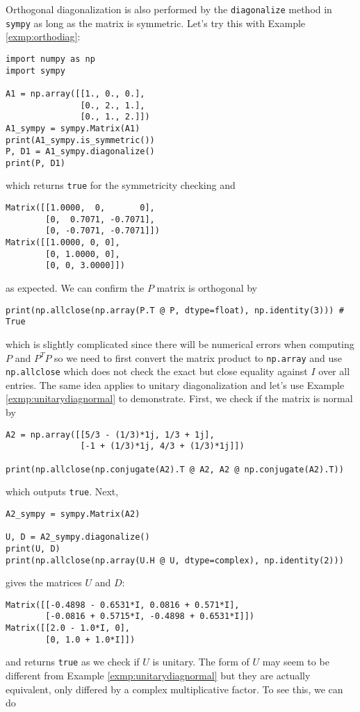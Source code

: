 Orthogonal diagonalization is also performed by the \verb|diagonalize| method in \texttt{sympy} as long as the matrix is symmetric. Let's try this with Example \ref{exmp:orthodiag}:
\begin{lstlisting}
import numpy as np
import sympy

A1 = np.array([[1., 0., 0.],
               [0., 2., 1.],
               [0., 1., 2.]])
A1_sympy = sympy.Matrix(A1)
print(A1_sympy.is_symmetric())
P, D1 = A1_sympy.diagonalize()
print(P, D1)
\end{lstlisting}
which returns \verb|true| for the symmetricity checking and
\begin{lstlisting}
Matrix([[1.0000,  0,       0], 
        [0,  0.7071, -0.7071], 
        [0, -0.7071, -0.7071]])
Matrix([[1.0000, 0, 0], 
        [0, 1.0000, 0], 
        [0, 0, 3.0000]])    
\end{lstlisting}
as expected. We can confirm the $P$ matrix is orthogonal by
\begin{lstlisting}
print(np.allclose(np.array(P.T @ P, dtype=float), np.identity(3))) # True
\end{lstlisting}
which is slightly complicated since there will be numerical errors when computing $P$ and $P^T P$ so we need to first convert the matrix product to \verb|np.array| and use \verb|np.allclose| which does not check the exact but close equality against $I$ over all entries. The same idea applies to unitary diagonalization and let's use Example \ref{exmp:unitarydiagnormal} to demonstrate. First, we check if the matrix is normal by 
\begin{lstlisting}
A2 = np.array([[5/3 - (1/3)*1j, 1/3 + 1j],
               [-1 + (1/3)*1j, 4/3 + (1/3)*1j]])

print(np.allclose(np.conjugate(A2).T @ A2, A2 @ np.conjugate(A2).T))
\end{lstlisting}
which outputs \verb|true|. Next,
\begin{lstlisting}
A2_sympy = sympy.Matrix(A2)

U, D = A2_sympy.diagonalize()
print(U, D)
print(np.allclose(np.array(U.H @ U, dtype=complex), np.identity(2)))
\end{lstlisting}
gives the matrices $U$ and $D$:
\begin{lstlisting}
Matrix([[-0.4898 - 0.6531*I, 0.0816 + 0.571*I], 
        [-0.0816 + 0.5715*I, -0.4898 + 0.6531*I]]) 
Matrix([[2.0 - 1.0*I, 0], 
        [0, 1.0 + 1.0*I]])  
\end{lstlisting}
and returns \verb|true| as we check if $U$ is unitary. The form of $U$ may seem to be different from Example \ref{exmp:unitarydiagnormal} but they are actually equivalent, only differed by a complex multiplicative factor. To see this, we can do
